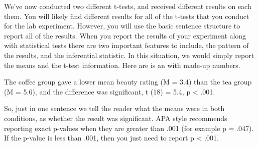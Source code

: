 We've now conducted two different t-tests, and received different
results on each them. You will likely find different results for all of
the t-tests that you conduct for the lab experiment. However, you will
use the basic sentence structure to report all of the results. When you
report the results of your experiment along with statistical tests there
are two important features to include, the pattern of the results, and
the inferential statistic. In this situation, we would simply report the
means and the t-test information. Here are is an with made-up numbers.

The coffee group gave a lower mean beauty rating (M = 3.4) than the tea
group (M = 5.6), and the difference was significant, t (18) = 5.4, p
\textless{} .001.

So, just in one sentence we tell the reader what the means were in both
conditions, as whether the result was significant. APA style recommends
reporting exact p-values when they are greater than .001 (for example p
= .047). If the p-value is less than .001, then you just need to report
p \textless{} .001.

